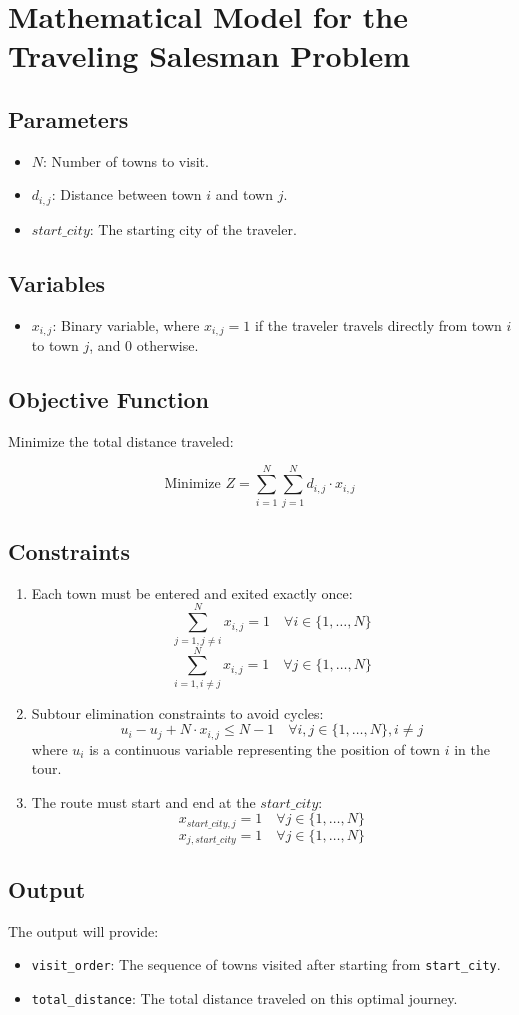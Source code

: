\documentclass{article}
\begin{document}
\section*{Mathematical Model for the Traveling Salesman Problem}

\subsection*{Parameters}
\begin{itemize}
    \item $N$: Number of towns to visit.
    \item $d_{i,j}$: Distance between town $i$ and town $j$.
    \item $start\_city$: The starting city of the traveler.
\end{itemize}

\subsection*{Variables}
\begin{itemize}
    \item $x_{i,j}$: Binary variable, where $x_{i,j} = 1$ if the traveler travels directly from town $i$ to town $j$, and $0$ otherwise.
\end{itemize}

\subsection*{Objective Function}
Minimize the total distance traveled:

\[
\text{Minimize } Z = \sum_{i=1}^{N} \sum_{j=1}^{N} d_{i,j} \cdot x_{i,j}
\]

\subsection*{Constraints}
\begin{enumerate}
    \item Each town must be entered and exited exactly once:
    \[
    \sum_{j=1, j \neq i}^{N} x_{i,j} = 1 \quad \forall i \in \{1, \ldots, N\}
    \]
    \[
    \sum_{i=1, i \neq j}^{N} x_{i,j} = 1 \quad \forall j \in \{1, \ldots, N\}
    \]

    \item Subtour elimination constraints to avoid cycles:
    \[
    u_i - u_j + N \cdot x_{i,j} \leq N - 1 \quad \forall i,j \in \{1, \ldots, N\}, i \neq j
    \]
    where $u_i$ is a continuous variable representing the position of town $i$ in the tour.

    \item The route must start and end at the $start\_city$:
    \[
    x_{start\_city,j} = 1 \quad \forall j \in \{1, \ldots, N\}
    \]
    \[
    x_{j,start\_city} = 1 \quad \forall j \in \{1, \ldots, N\}
    \]
\end{enumerate}

\subsection*{Output}
The output will provide:
\begin{itemize}
    \item \texttt{visit\_order}: The sequence of towns visited after starting from \texttt{start\_city}.
    \item \texttt{total\_distance}: The total distance traveled on this optimal journey.
\end{itemize}
\end{document}
